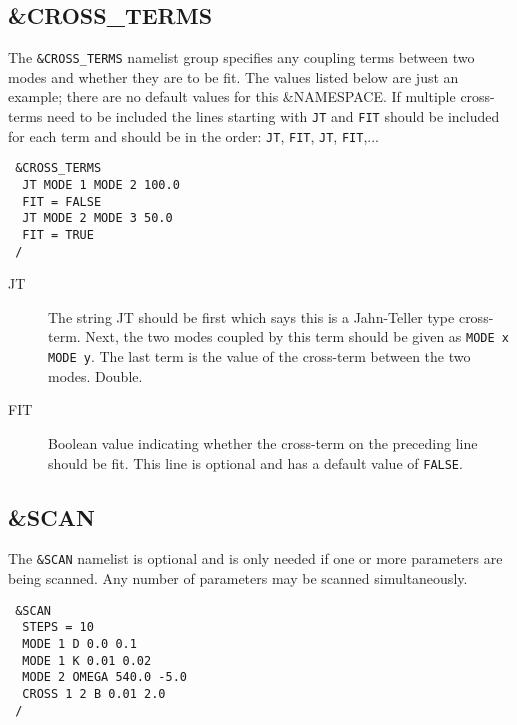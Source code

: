\documentclass{article}
\begin{document}
\subsection{\&CROSS\_TERMS} The {\tt \&CROSS\_TERMS} namelist group specifies
any coupling terms between two modes and whether they are to be fit. The values listed below are just an example; there are no default values for this \&NAMESPACE. If multiple cross-terms need to be included the lines starting with {\tt JT} and {\tt FIT} should be included for each term and should be in the order: {\tt JT}, {\tt FIT}, {\tt JT}, {\tt FIT},...

\begin{verbatim}
 &CROSS_TERMS
  JT MODE 1 MODE 2 100.0
  FIT = FALSE
  JT MODE 2 MODE 3 50.0
  FIT = TRUE
 /
\end{verbatim}

\begin{description}
\item[JT] The string JT should be first which says this is a Jahn-Teller type cross-term.
Next, the two modes coupled by this term should be given as {\tt MODE x MODE y}. 
The last term is the value of the cross-term between the two modes. Double.

\item[FIT] Boolean value indicating whether the cross-term on the preceding line
should be fit. This line is optional and has a default value of {\tt FALSE}.

\end{description}

\subsection{\&SCAN} \label{scan}

The {\tt \&SCAN} namelist is optional and is only needed if one or more parameters
are being scanned. Any number of parameters may be scanned simultaneously.

\begin{verbatim}
 &SCAN
  STEPS = 10
  MODE 1 D 0.0 0.1
  MODE 1 K 0.01 0.02
  MODE 2 OMEGA 540.0 -5.0
  CROSS 1 2 B 0.01 2.0
 /
\end{verbatim}
\end{document}
